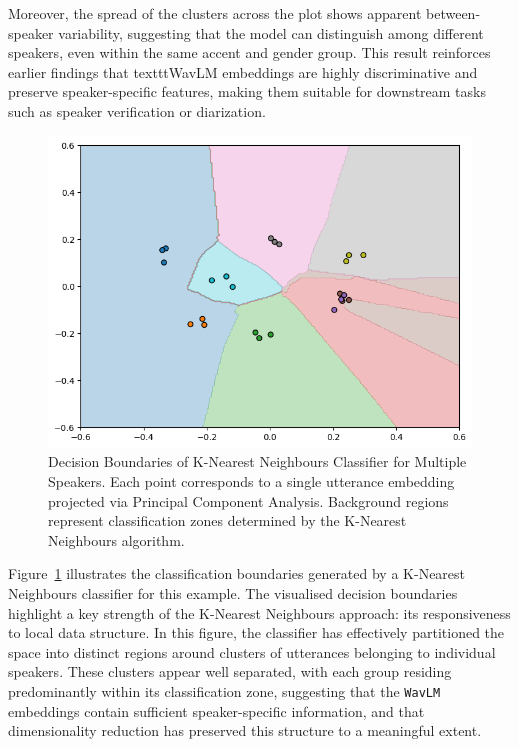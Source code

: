\documentclass[conference]{IEEEtran}
\begin{document}
	Moreover, the spread of the clusters across the plot shows apparent between-speaker variability, suggesting that the model can distinguish among different speakers, even within the same accent and gender group. This result reinforces earlier findings that texttt{WavLM} embeddings are highly discriminative and preserve speaker-specific features, making them suitable for downstream tasks such as speaker verification or diarization.
	
	\begin{figure}[h]
		\centering
		\includegraphics[width=1\linewidth]{img/img-knn-speaker-separation.png}
		\caption{Decision Boundaries of K-Nearest Neighbours Classifier for Multiple Speakers. Each point corresponds to a single utterance embedding projected via Principal Component Analysis. Background regions represent classification zones determined by the K-Nearest Neighbours algorithm.}
		\label{fig:knn-speaker}
	\end{figure}
	
	Figure~\ref{fig:knn-speaker} illustrates the classification boundaries generated by a K-Nearest Neighbours classifier for this example. The visualised decision boundaries highlight a key strength of the K-Nearest Neighbours approach: its responsiveness to local data structure. In this figure, the classifier has effectively partitioned the space into distinct regions around clusters of utterances belonging to individual speakers. These clusters appear well separated, with each group residing predominantly within its classification zone, suggesting that the \texttt{WavLM }embeddings contain sufficient speaker-specific information, and that dimensionality reduction has preserved this structure to a meaningful extent.
	
\end{document}
